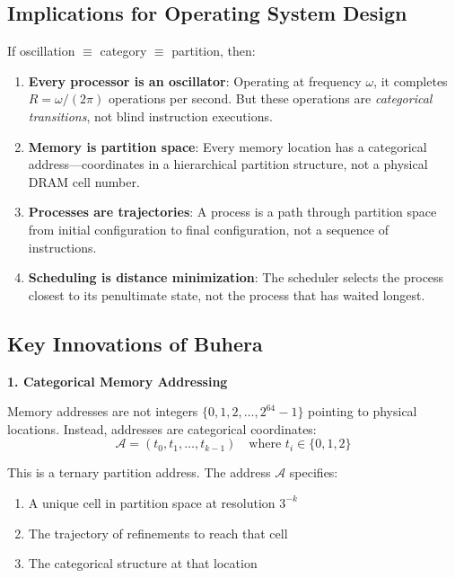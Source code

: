 \documentclass[twocolumn,10pt]{article}
\theoremstyle{definition}
\theoremstyle{remark}
\newcommand{\cataddr}{\mathcal{A}}
\begin{document}
\subsection{Implications for Operating System Design}

If oscillation $\equiv$ category $\equiv$ partition, then:

\begin{enumerate}
    \item \textbf{Every processor is an oscillator}: Operating at frequency $\omega$, it completes $R = \omega/(2\pi)$ operations per second. But these operations are \emph{categorical transitions}, not blind instruction executions.

    \item \textbf{Memory is partition space}: Every memory location has a categorical address—coordinates in a hierarchical partition structure, not a physical DRAM cell number.

    \item \textbf{Processes are trajectories}: A process is a path through partition space from initial configuration to final configuration, not a sequence of instructions.

    \item \textbf{Scheduling is distance minimization}: The scheduler selects the process closest to its penultimate state, not the process that has waited longest.
\end{enumerate}

\subsection{Key Innovations of Buhera}

\textbf{1. Categorical Memory Addressing}

Memory addresses are not integers $\{0, 1, 2, \ldots, 2^{64}-1\}$ pointing to physical locations. Instead, addresses are categorical coordinates:
\begin{equation}
    \cataddr = (t_0, t_1, \ldots, t_{k-1}) \quad \text{where } t_i \in \{0, 1, 2\}
\end{equation}

This is a ternary partition address. The address $\cataddr$ specifies:
\begin{enumerate}
    \item A unique cell in partition space at resolution $3^{-k}$
    \item The trajectory of refinements to reach that cell
    \item The categorical structure at that location
\end{enumerate}
\end{document}
